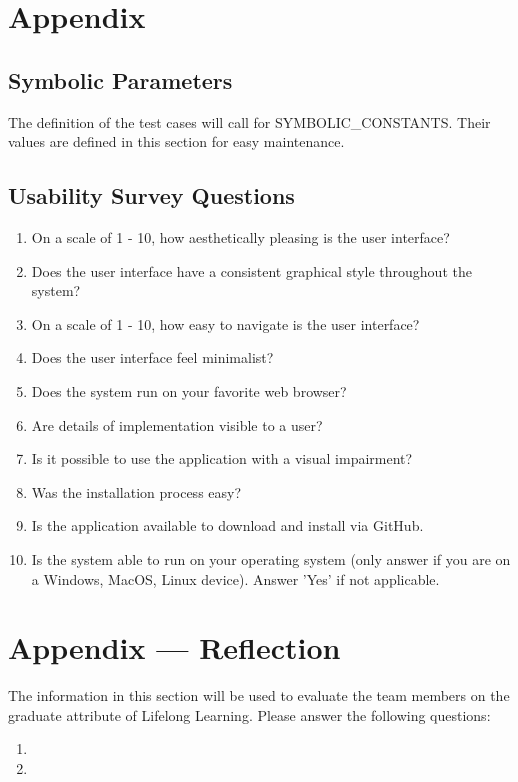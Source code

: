 \documentclass[12pt, titlepage]{article}
\begin{document}
\newpage





\newpage

\section{Appendix}

\subsection{Symbolic Parameters}

The definition of the test cases will call for SYMBOLIC\_CONSTANTS.
Their values are defined in this section for easy maintenance.

\subsection{Usability Survey Questions}

\begin{enumerate}
  \item On a scale of 1 - 10, how aesthetically pleasing is the user interface?
  \item Does the user interface have a consistent graphical style throughout the system?
  \item On a scale of 1 - 10, how easy to navigate is the user interface?
  \item Does the user interface feel minimalist?
  \item Does the system run on your favorite web browser?
  \item Are details of implementation visible to a user?
  \item Is it possible to use the application with a visual impairment?
  \item Was the installation process easy?
  \item Is the application available to download and install via GitHub.
  \item Is the system able to run on your operating system (only answer if you are on a Windows, MacOS, Linux device). Answer 'Yes' if not applicable.
\end{enumerate}

\newpage{}
\section*{Appendix --- Reflection}

The information in this section will be used to evaluate the team members on the
graduate attribute of Lifelong Learning.  Please answer the following questions:

\begin{enumerate}
  \item 
  \item 
\end{enumerate}
\end{document}
